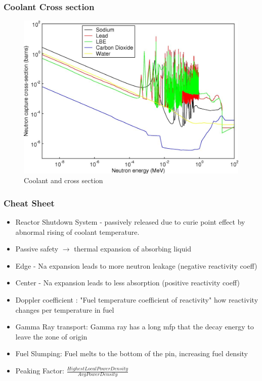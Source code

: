 \documentclass[9pt]{beamer}
\begin{document}


\begin{frame}
\frametitle{Coolant Cross section}
\begin{figure}[htbp!]
  \begin{center}
      \includegraphics[scale=0.7]{./images/coolant.jpg}
  \end{center}
  \caption{Coolant and cross section \cite{stacey_nuclear_2007}}
  \label{fig:reac}
\end{figure}
\end{frame}


\begin{frame}
\frametitle{Cheat Sheet}
\begin{itemize}
  \item Reactor Shutdown System - passively released due to curie point effect by abnormal rising of coolant temperature.
  \item Passive safety $\rightarrow$ thermal expansion of absorbing liquid
  \item Edge - Na expansion leads to more neutron leakage (negative reactivity coeff)
  \item Center - Na expansion leads to less absorption (positive reactivity coeff)
  \item Doppler coefficient : "Fuel temperature coefficient of reactivity" how reactivity changes per temperature in fuel
  \item Gamma Ray transport: Gamma ray has a long mfp that the decay energy to leave the zone of origin
  \item Fuel Slumping: Fuel melts to the bottom of the pin, increasing fuel density
  \item Peaking Factor: $\frac{Highest Local Power Density}{Avg Power Density}$
\end{itemize}
\end{frame}
\end{document}
